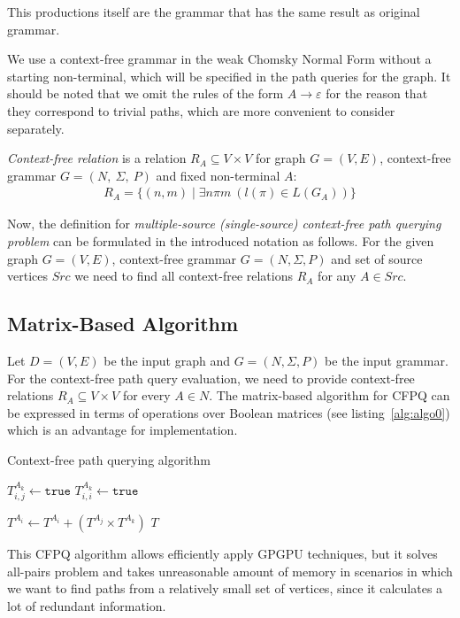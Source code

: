 This productions itself are the grammar that has the same result as original grammar.

We use a context-free grammar in the weak Chomsky Normal Form without a starting non-terminal, which will be specified in the path queries for the graph. It should be noted that we omit the rules of the form $A \rightarrow \varepsilon$ for the reason that they correspond to trivial paths, which are more convenient to consider separately.

\begin{definition}\emph{Context-free relation} is a relation $R_A \subseteq V \times V$ for graph $G = (V, E)$, context-free grammar $G = (N,~\Sigma,~P)$ and fixed non-terminal $A$:
\begin{align*}
     R_A = \{(n, m) \mid \exists n \pi m~(l(\pi) \in L(G_A))\}
\end{align*}
\end{definition}

 Now, the definition for \emph{multiple-source (single-source) context-free path querying problem} can be formulated in the introduced notation as follows. For the given graph $G = (V, E)$, context-free grammar $G=(N, \Sigma, P)$ and set of source vertices $Src$ we need to find all context-free relations $R_A$ for any $A \in Src$. 
 
\subsection{Matrix-Based Algorithm}
Let $D = (V, E)$ be the input graph and $G = (N, \Sigma, P)$ be the input grammar. For the context-free path query evaluation, we need to provide context-free relations \mbox{$R_A \subseteq V \times V$} for every \mbox{$A \in N$}.
The matrix-based algorithm for CFPQ can be expressed in terms of operations over Boolean matrices (see listing~\ref{alg:algo0}) which is an advantage for implementation.
{\footnotesize
\begin{algorithm}
\begin{algorithmic}[1]
\caption{Context-free path querying algorithm}
\label{alg:algo0}
          {$T^{A_k}_{i,j} \gets \texttt{true}$}
    \EndFor
            {$T^{A_k}_{i,i} \gets \texttt{true}$}
        \EndFor
    \EndFor

          { $T^{A_i} \gets T^{A_i} + (T^{A_j} \times T^{A_k})$ } 
        \EndFor
    \EndWhile
\State \Return $T$
\EndFunction
\end{algorithmic}
\end{algorithm}
}

This CFPQ algorithm allows efficiently apply GPGPU techniques, but it solves all-pairs problem and takes unreasonable amount of memory in scenarios in which we want to find paths from a relatively small set of vertices, since it calculates a lot of redundant information.  